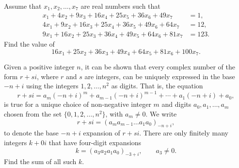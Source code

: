 \documentclass[11pt]{article}
\theoremstyle{definition}
\begin{document}
\begin{question}[name={1989 AIME, \href{https://artofproblemsolving.com/community/c4p436470}{Problem 8}}]
	Assume that $x_1,x_2,\ldots,x_7$ are real numbers such that
	\begin{align*}
		x_1+4x_2+9x_3+16x_4+25x_5+36x_6+49x_7 &=1, \\ 
		4x_1+9x_2+16x_3+25x_4+36x_5+49x_6+64x_7 &=12,\\ 
		9x_1+16x_2+25x_3+36x_4+49x_5+64x_6+81x_7 &=123.
	\end{align*}  
	Find the value of\[16x_1+25x_2+36x_3+49x_4+64x_5+81x_6+100x_7.\]
\end{question}

%
%	
%




\begin{question}[name={1989 AIME, \href{https://artofproblemsolving.com/community/c4p436603}{Problem 14}}]
	Given a positive integer $n$, it can be shown that every complex number of the form $r+si$, where $r$ and $s$ are integers, can be uniquely expressed in the base $-n+i$ using the integers $1,2,\ldots,n^2$ as digits. That is, the equation\[ r+si=a_m(-n+i)^m+a_{m-1}(-n+i)^{m-1}+\cdots +a_1(-n+i)+a_0,  \]is true for a unique choice of non-negative integer $m$ and digits $a_0,a_1,\ldots,a_m$ chosen from the set $\{0,1,2,\ldots,n^2\}$, with $a_m\ne 0$. We write\[ r+si=(a_ma_{m-1}\ldots a_1a_0)_{-n+i},  \]to denote the base $-n+i$ expansion of $r+si$. There are only finitely many integers $k+0i$ that have four-digit expansions\[ k=(a_3a_2a_1a_0)_{-3+i}, \qquad a_3\ne 0.  \]Find the sum of all such $k$.
\end{question}
\end{document}
